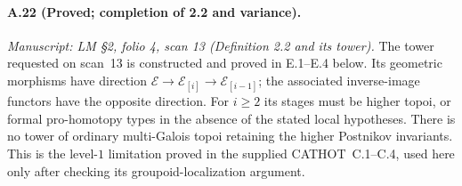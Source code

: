\paragraph{A.22 (Proved; completion of 2.2 and variance).}
\textit{Manuscript: LM \S2, folio 4, scan 13 (Definition 2.2 and its tower).}
The tower requested on scan~13 is constructed and proved in E.1--E.4 below. Its geometric morphisms have direction
$\mathcal E\to\mathcal E_{[i]}\to\mathcal E_{[i-1]}$;
the associated inverse-image functors have the opposite direction. For $i\ge2$ its stages must be higher topoi, or formal pro-homotopy types in the absence of the stated local hypotheses. There is no tower of ordinary multi-Galois topoi retaining the higher Postnikov invariants. This is the level-$1$ limitation proved in the supplied CATHOT~C.1--C.4, used here only after checking its groupoid-localization argument.
